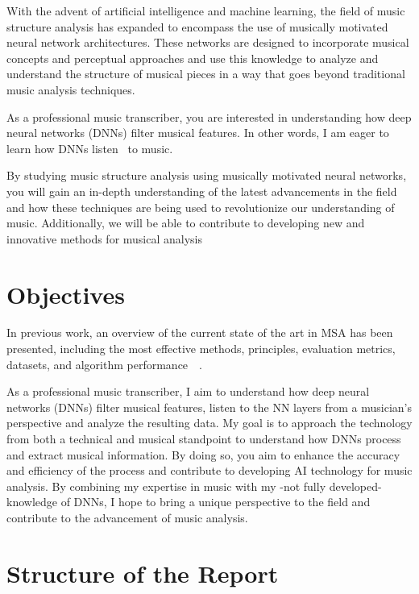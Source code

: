 With the advent of artificial intelligence and machine learning, the field of music structure analysis has expanded to encompass the use of musically motivated neural network architectures. These networks are designed to incorporate musical concepts and perceptual approaches and use this knowledge to analyze and understand the structure of musical pieces in a way that goes beyond traditional music analysis techniques.

As a professional music transcriber, you are interested in understanding how deep neural networks (DNNs) filter musical features. In other words, I am eager to learn how DNNs listen~\cite{7500246} to music.

By studying music structure analysis using musically motivated neural networks, you will gain an in-depth understanding of the latest advancements in the field and how these techniques are being used to revolutionize our understanding of music. Additionally, we will be able to contribute to developing new and innovative methods for musical analysis~\cite{Huang2019MusicTG}

\section{Objectives}

In previous work, an overview of the current state of the art in MSA has been presented, including the most effective methods, principles, evaluation metrics, datasets, and algorithm performance~\cite{Nieto2020}~\cite{Chaki2021}.

As a professional music transcriber, I aim to understand how deep neural networks (DNNs) filter musical features, listen to the NN layers from a musician's perspective and analyze the resulting data. My goal is to approach the technology from both a technical and musical standpoint to understand how DNNs process and extract musical information. By doing so, you aim to enhance the accuracy and efficiency of the process and contribute to developing AI technology for music analysis. By combining my expertise in music with my -not fully developed- knowledge of DNNs, I hope to bring a unique perspective to the field and contribute to the advancement of music analysis.

\section{Structure of the Report}


\newpage



